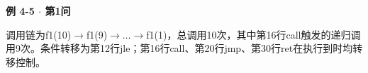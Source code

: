 {\color{ink}\bfseries 例 4-5 \(\cdot \) 第1问}\par\vspace{1bp}调用链为f1(10)\(\to \)f1(9)\(\to \)\(\ldots \)\(\to \)f1(1)，总调用10次，其中第16行call触发的递归调用9次。条件转移为第12行jle；第16行call、第20行jmp、第30行ret在执行到时均转移控制。
